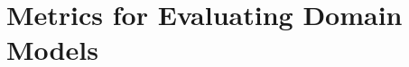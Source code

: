 \documentclass{article}
\theoremstyle{definition}
\theoremstyle{remark}
\newcommand{\realm}{{\ensuremath{M^*}}\xspace}
\newif\ifaddcomments
\newcommand{\roni}[1]{\ifaddcomments{\textcolor{red}{[Roni: #1]}}\fi}
\newcommand{\gregor}[1]{\ifaddcomments{\textcolor{orange}{[Gregor: #1]}}\fi}
\begin{document}
\section{Metrics for Evaluating Domain Models}
\label{sec:metrics}
\end{document}
